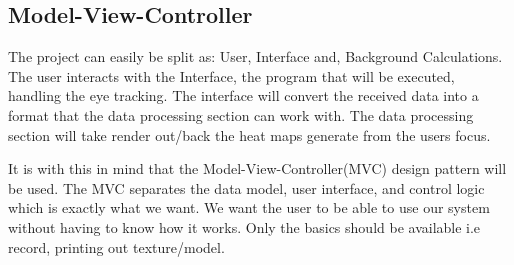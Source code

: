 \subsection{Model-View-Controller} 
\begin{flushleft}
The project can easily be split as: User, Interface and, Background Calculations. The user interacts with the Interface, the program that will be executed, handling the eye tracking. The interface will convert the received data into a format that the data processing section can work with. The data processing section will take render out/back the heat maps generate from the users focus.

It is with this in mind that the Model-View-Controller(MVC) design pattern will be used.
The MVC separates the data model, user interface, and control logic which is exactly what we want. We want the user to be able to use our system without having to know how it works. Only the basics should be available i.e record, printing out texture/model.
\end{flushleft}